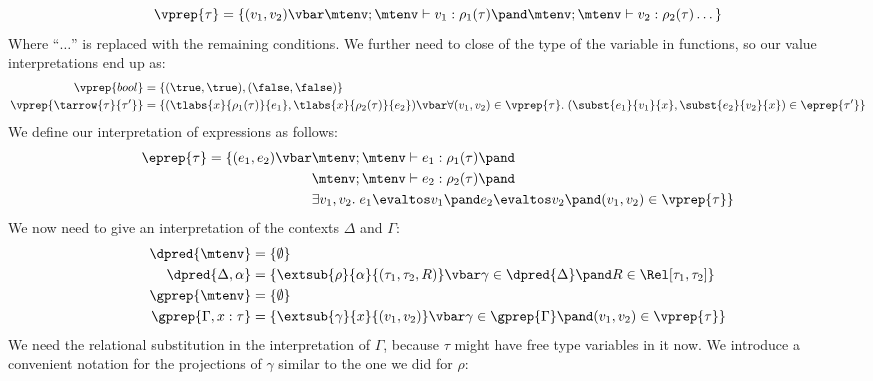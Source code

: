 \[
  \vprep{\tau} = \{(v_1,v_2) \vbar \mtenv ; \mtenv \vdash v_1 : \rho_1(\tau) \pand \mtenv ; \mtenv \vdash v_2 : \rho_2(\tau) \dots \}
\]
Where ``$\dots$'' is replaced with the remaining conditions. We further need to close of the type of the variable in functions, so our value interpretations end up as:
\begin{align*}
  \vprep{bool}                 & = \{ (\true,\true), (\false,\false) \} \\
  \vprep{\tarrow{\tau}{\tau'}} & = \{ (\tlabs{x}{\rho_1(\tau)}{e_1},\tlabs{x}{\rho_2(\tau)}{e_2}) \vbar \forall (v_1,v_2) \in \vprep{\tau}. \; (\subst{e_1}{v_1}{x},\subst{e_2}{v_2}{x}) \in \eprep{\tau'} \}
\end{align*}
We define our interpretation of expressions as follows:
\begin{align*}
  \eprep{\tau} = \{(e_1,e_2) \vbar & \mtenv ; \mtenv \vdash e_1 : \rho_1(\tau) \pand \\
                                   & \mtenv ; \mtenv \vdash e_2 : \rho_2(\tau) \pand \\
                                   &  \exists v_1,v_2.\; e_1 \evaltos v_1 \pand
                                            e_2 \evaltos v_2 \pand
                                            (v_1,v_2) \in \vprep{\tau} \}
\end{align*}
We now need to give an interpretation of the contexts $\Delta$ and $\Gamma$:
\begin{align*}
  \dpred{\mtenv}         &= \{\emptyset \} \\
  \dpred{\Delta, \alpha} &= \{\extsub{\rho}{\alpha}{(\tau_1,\tau_2,R)} \vbar 
                                 \gamma \in \dpred{\Delta} \pand 
                                 R \in \Rel[\tau_1,\tau_2] \} \\
  \gprep{\mtenv}         &= \{\emptyset \} \\
  \gprep{\Gamma, x:\tau} &= \{\extsub{\gamma}{x}{(v_1,v_2)} \vbar 
                                 \gamma \in \gprep{\Gamma} \pand
                                 (v_1,v_2) \in \vprep{\tau}\}
\end{align*}
We need the relational substitution in the interpretation of $\Gamma$, because $\tau$ might have free type variables in it now.
We introduce a convenient notation for the projections of $\gamma$ similar to the one we did for $\rho$: %
